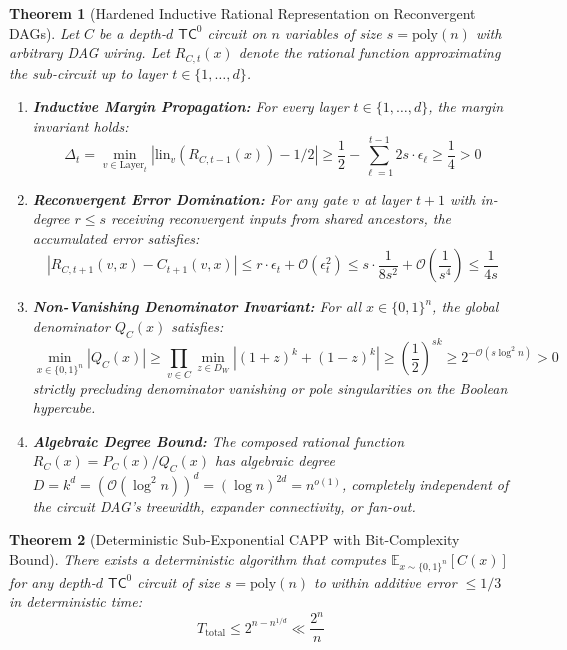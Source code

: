 \documentclass[11pt,a4paper]{article}
\newtheorem{theorem}{Theorem}[section]
\theoremstyle{definition}
\theoremstyle{remark}
\newcommand{\TC}{\mathsf{TC}}
\newcommand{\poly}{\mathrm{poly}}
\newcommand{\E}{\mathbb{E}}
\begin{document}
\begin{theorem}[Hardened Inductive Rational Representation on Reconvergent DAGs]\label{thm:tc0_rational_rep}
Let $C$ be a depth-$d$ $\TC^0$ circuit on $n$ variables of size $s = \poly(n)$ with arbitrary DAG wiring. Let $R_{C,t}(x)$ denote the rational function approximating the sub-circuit up to layer $t \in \{1, \dots, d\}$.
\begin{enumerate}
    \item \textbf{Inductive Margin Propagation:} For every layer $t \in \{1, \dots, d\}$, the margin invariant holds:
    \[
    \Delta_t = \min_{v \in \mathrm{Layer}_t} |\mathrm{lin}_v(R_{C,t-1}(x)) - 1/2| \ge \frac{1}{2} - \sum_{\ell=1}^{t-1} 2s \cdot \epsilon_\ell \ge \frac{1}{4} > 0
    \]
    \item \textbf{Reconvergent Error Domination:} For any gate $v$ at layer $t+1$ with in-degree $r \le s$ receiving reconvergent inputs from shared ancestors, the accumulated error satisfies:
    \[
    |R_{C,t+1}(v, x) - C_{t+1}(v, x)| \le r \cdot \epsilon_t + \mathcal{O}(\epsilon_t^2) \le s \cdot \frac{1}{8s^2} + \mathcal{O}\left(\frac{1}{s^4}\right) \le \frac{1}{4s}
    \]
    \item \textbf{Non-Vanishing Denominator Invariant:} For all $x \in \{0,1\}^n$, the global denominator $Q_C(x)$ satisfies:
    \[
    \min_{x \in \{0,1\}^n} |Q_C(x)| \ge \prod_{v \in C} \min_{z \in D_W} |(1+z)^k + (1-z)^k| \ge \left(\frac{1}{2}\right)^{s k} \ge 2^{-\mathcal{O}(s \log^2 n)} > 0
    \]
    strictly precluding denominator vanishing or pole singularities on the Boolean hypercube.
    \item \textbf{Algebraic Degree Bound:} The composed rational function $R_C(x) = P_C(x) / Q_C(x)$ has algebraic degree $D = k^d = (\mathcal{O}(\log^2 n))^d = (\log n)^{2d} = n^{o(1)}$, completely independent of the circuit DAG's treewidth, expander connectivity, or fan-out.
\end{enumerate}
\end{theorem}

\begin{theorem}[Deterministic Sub-Exponential CAPP with Bit-Complexity Bound]\label{thm:tc0_subexp_capp}
There exists a deterministic algorithm that computes $\E_{x \sim \{0,1\}^n}[C(x)]$ for any depth-$d$ $\TC^0$ circuit of size $s = \poly(n)$ to within additive error $\le 1/3$ in deterministic time:
\[
T_{\mathrm{total}} \le 2^{n - n^{1/d}} \ll \frac{2^n}{n}
\]
\end{theorem}
\end{document}
